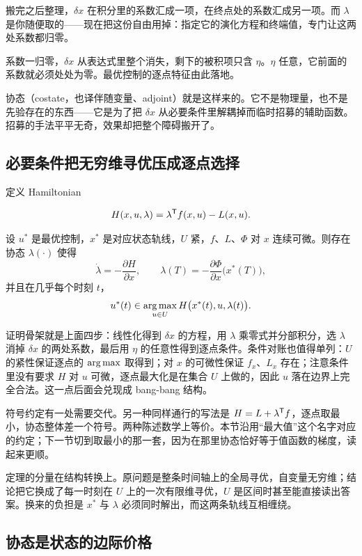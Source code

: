 搬完之后整理，\(\delta x\) 在积分里的系数汇成一项，在终点处的系数汇成另一项。而 \(\lambda\) 是你随便取的——现在把这份自由用掉：指定它的演化方程和终端值，专门让这两处系数都归零。

系数一归零，\(\delta x\) 从表达式里整个消失，剩下的被积项只含 \(\eta\)。\(\eta\) 任意，它前面的系数就必须处处为零。最优控制的逐点特征由此落地。

协态（costate，也译伴随变量、adjoint）就是这样来的。它不是物理量，也不是先验存在的东西——它是为了把 \(\delta x\) 从必要条件里解耦掉而临时招募的辅助函数。招募的手法平平无奇，效果却把整个障碍搬开了。

\subsection{必要条件把无穷维寻优压成逐点选择}

定义 Hamiltonian

\[
H(x,u,\lambda) = \lambda^{\mathsf{T}} f(x,u) - L(x,u).
\]

\begin{theorem}
设 \(u^*\) 是最优控制，\(x^*\) 是对应状态轨线，\(U\) 紧，\(f\)、\(L\)、\(\Phi\) 对 \(x\) 连续可微。则存在协态 \(\lambda(\cdot)\) 使得
\[
\dot\lambda = -\frac{\partial H}{\partial x},
\qquad
\lambda(T) = -\frac{\partial\Phi}{\partial x}\big(x^*(T)\big),
\]
并且在几乎每个时刻 \(t\)，
\[
u^*(t) \in \operatorname*{arg\,max}_{u\in U} H\big(x^*(t), u, \lambda(t)\big).
\]
\end{theorem}

证明骨架就是上面四步：线性化得到 \(\delta x\) 的方程，用 \(\lambda\) 乘零式并分部积分，选 \(\lambda\) 消掉 \(\delta x\) 的两处系数，最后用 \(\eta\) 的任意性得到逐点条件。条件对账也值得单列：\(U\) 的紧性保证逐点的 \(\operatorname*{arg\,max}\) 取得到；对 \(x\) 的可微性保证 \(f_x\)、\(L_x\) 存在；注意条件里没有要求 \(H\) 对 \(u\) 可微，逐点最大化是在集合 \(U\) 上做的，因此 \(u\) 落在边界上完全合法。这一点后面会兑现成 bang-bang 结构。

符号约定有一处需要交代。另一种同样通行的写法是 \(H = L + \lambda^{\mathsf{T}} f\)，逐点取最小，协态整体差一个符号。两种陈述数学上等价。本节沿用``最大值''这个名字对应的约定；下一节切到取最小的那一套，因为在那里协态恰好等于值函数的梯度，读起来更顺。

定理的分量在结构转换上。原问题是整条时间轴上的全局寻优，自变量无穷维；结论把它换成了每一时刻在 \(U\) 上的一次有限维寻优，\(U\) 是区间时甚至能直接读出答案。换来的负担是 \(x^*\) 与 \(\lambda\) 必须同时解出，而这两条轨线互相缠绕。

\subsection{协态是状态的边际价格}

